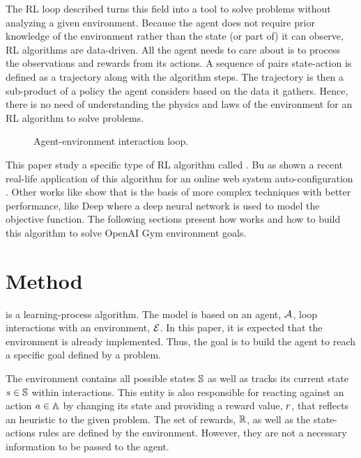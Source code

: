 \documentclass[conference]{IEEEtran}
\begin{document}
The RL loop described turns this field into a tool to solve problems without analyzing a given environment.
Because the agent does not require prior knowledge of the environment rather than the state (or part of) it can observe, RL algorithms are data-driven.
All the agent needs to care about is to process the observations and rewards from its actions.
A sequence of pairs state-action is defined as a trajectory along with the algorithm steps.
The trajectory is then a sub-product of a policy the agent considers based on the data it gathers.
Hence, there is no need of understanding the physics and laws of the environment for an RL algorithm to solve problems.

\begin{figure}[b]
    \centering
    
    \caption{Agent-environment interaction loop.}
    \label{agent-environment}
\end{figure}

This paper study a specific type of RL algorithm called {\Qlearning}.
Bu as shown a recent real-life application of this algorithm for an online web system auto-configuration \cite{Bu:2009}.
Other works like \cite{Zheng:2018} show that {\Qlearning} is the basis of more complex techniques with better performance, like Deep{\QLearning} where a deep neural network is used to model the {\Qlearning} objective function.
The following sections present how {\Qlearning} works and how to build this algorithm to solve OpenAI Gym \cite{OpenAIGym} environment goals.


\section{Method}

{\QLearning} is a learning-process algorithm.
The model is based on an agent, $\mathcal{A}$, loop interactions with an environment, $\mathcal{E}$.
In this paper, it is expected that the environment is already implemented.
Thus, the goal is to build the agent to reach a specific goal defined by a problem.

The environment contains all possible states $\mathbb{S}$ as well as tracks its current state $s \in \mathbb{S}$ within interactions.
This entity is also responsible for reacting against an action $a \in \mathbb{A}$ by changing its state and providing a reward value, $r$, that reflects an heuristic to the given problem.
The set of rewards, $\mathbb{R}$, as well as the state-actions rules are defined by the environment.
However, they are not a necessary information to be passed to the agent.
\end{document}
